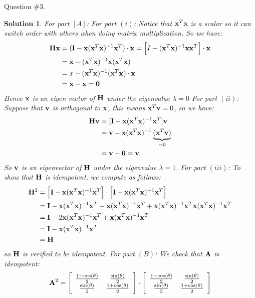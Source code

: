 \documentclass[11pt]{article}\usepackage[]{graphicx}\usepackage[]{color}
\newtheorem{sol}{Solution}
\begin{document}
Question $\# 3.$
\begin{sol}
	For part $[A]$:\vskip 2mm
	For part $(i)$:\vskip 2mm
	Notice that ${\bf x}^T{\bf x}$ is a scalar so it can switch order with others when doing matrix multiplication. So we have:
	\begin{align*}
		{\bf H}{\bf x} &= ({\bf I} - {\bf x}({\bf x}^T{\bf x})^{-1}{\bf x}^T)\cdot {\bf x}  = \Big[I - ({\bf x}^T{\bf x})^{-1}{\bf x}{\bf x}^T\Big]\cdot {\bf x}\\
		&= {\bf x} - ({\bf x}^T{\bf x})^{-1}{\bf x}({\bf x}^T{\bf x})\\
		&= x - ({\bf x}^T{\bf x})^{-1}({\bf x}^T{\bf x})\cdot {\bf x}\\
		&= {\bf x} - {\bf x} = {\bf 0}
	\end{align*}
	Hence ${\bf x}$ is an eigen vector of ${\bf H}$ under the eigenvalue $\lambda = 0$
	For part $(ii)$:\vskip 2mm
	Suppose that ${\bf v}$ is orthogonal to ${\bf x}$, this means ${\bf x}^T{\bf v}  = 0$, so we have:
	\begin{align*}
		{\bf H}{\bf v} &= [{\bf I} - {\bf x}({\bf x}^T{\bf x})^{-1}{\bf x}^T]{\bf v}\\
		&= {\bf v} -{\bf x}({\bf x}^T{\bf x})^{-1}\underbrace{({\bf x}^T{\bf v})}_{ = 0}\\
		&=  {\bf v} - {\bf 0} = {\bf v}
	\end{align*}
	So ${\bf v}$ is an eigenvector of ${\bf H}$ under the eigenvalue $\lambda = 1$.\vskip 2mm
	For part $(iii)$:\vskip 2mm
	To show that ${\bf H}$ is idempotent, we compute as follows:
	\begin{align*}
		{\bf H}^2 &= \Big[{\bf I} - {\bf x}({\bf x}^T{\bf x})^{-1}{\bf x}^T\Big]\cdot \Big[{\bf I} - {\bf x}({\bf x}^T{\bf x})^{-1}{\bf x}^T\Big]\\
		&= {\bf I} - {\bf x}({\bf x}^T{\bf x})^{-1}{\bf x}^T - {\bf x}({\bf x}^T{\bf x})^{-1}{\bf x}^T + {\bf x}({\bf x}^T{\bf x})^{-1}{\bf x}^T{\bf x}({\bf x}^T{\bf x})^{-1}{\bf x}^T\\
		&= {\bf I} - 2{\bf x}({\bf x}^T{\bf x})^{-1}{\bf x}^T + {\bf x}({\bf x}^T{\bf x})^{-1}{\bf x}^T\\
		&= {\bf I} - {\bf x}({\bf x}^T{\bf x})^{-1}{\bf x}^T\\
		&= {\bf H}
	\end{align*}
	so ${\bf H}$ is verified to be idempotent.\vskip 2mm
	For part $(B)$:\vskip 2mm
	We check that ${\bf A}$ is idempotent:
	\begin{align*}
		{\bf A}^2 = \left[\begin{array}{cc} \frac{1 - \cos(\theta)}{2}& \frac{\sin(\theta)}{2}\\ \frac{\sin(\theta)}{2}& \frac{1 + \cos(\theta)}{2}\end{array}\right]\cdot \left[\begin{array}{cc} \frac{1 - \cos(\theta)}{2}& \frac{\sin(\theta)}{2}\\ \frac{\sin(\theta)}{2}& \frac{1 + \cos(\theta)}{2}\end{array}\right]

\end{align*}
\end{sol}
\end{document}
